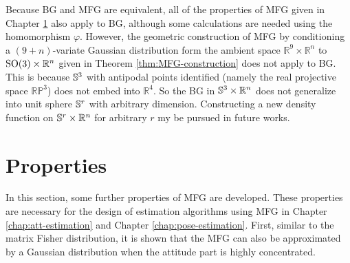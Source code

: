 Because BG and MFG are equivalent, all of the properties of MFG given in Chapter \ref{section:MFG-property} also apply to BG, although some calculations are needed using the homomorphism $\varphi$.
However, the geometric construction of MFG by conditioning a $(9+n)$-variate Gaussian distribution form the ambient space $\mathbb{R}^9\times\mathbb{R}^n$ to $\mathrm{SO}(3)\times\mathbb{R}^n$ given in Theorem \ref{thm:MFG-construction} does not apply to BG.
This is because $\mathbb{S}^3$ with antipodal points identified (namely the real projective space $\mathbb{RP}^3$) does not embed into $\mathbb{R}^4$.
So the BG in $\mathbb{S}^3\times \mathbb{R}^n$ does not generalize into unit sphere $\mathbb{S}^r$ with arbitrary dimension.
Constructing a new density function on $\mathbb{S}^r\times \mathbb{R}^n$ for arbitrary $r$ my be pursued in future works.

\section{Properties} \label{section:MFG-property}

In this section, some further properties of MFG are developed.
These properties are necessary for the design of estimation algorithms using MFG in Chapter \ref{chap:att-estimation} and Chapter \ref{chap:pose-estimation}.
First, similar to the matrix Fisher distribution, it is shown that the MFG can also be approximated by a Gaussian distribution when the attitude part is highly concentrated.

